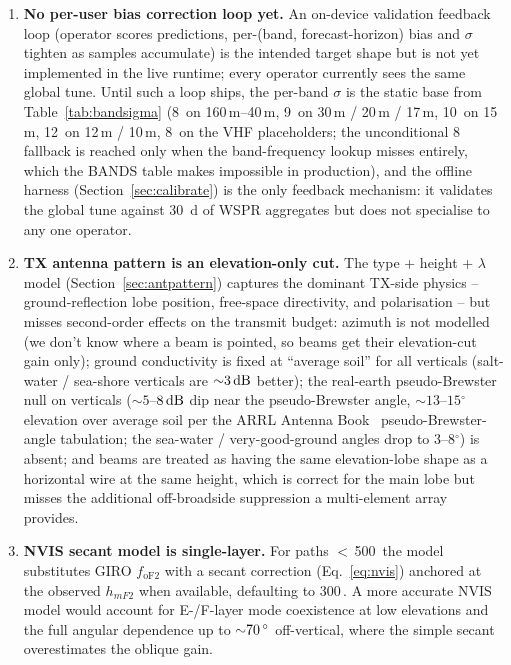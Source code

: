 \documentclass[11pt,a4paper]{article}
\newcommand{\SI}[2]{#1\,\text{#2}}
\newcommand{\dB}{\text{dB}}
\newcommand{\km}{\text{km}}
\newcommand{\degree}{\ensuremath{{}^\circ}}
\begin{document}
\begin{enumerate}[leftmargin=*]
  \item \textbf{No per-user bias correction loop yet.}  An
        on-device validation feedback loop (operator scores
        predictions, per-(band, forecast-horizon) bias and
        $\sigma$ tighten as samples accumulate) is the intended
        target shape but is not yet implemented in the live
        runtime; every operator currently sees the same global
        tune.  Until
        such a loop ships, the per-band $\sigma$ is the static
        base from Table~\ref{tab:bandsigma} (\SI{8}{\dB} on
        160\,m--40\,m, \SI{9}{\dB} on 30\,m / 20\,m / 17\,m,
        \SI{10}{\dB} on 15\,m, \SI{12}{\dB} on 12\,m / 10\,m,
        \SI{8}{\dB} on the VHF placeholders; the unconditional
        \SI{8}{\dB} fallback is reached only when the
        band-frequency lookup misses entirely, which the BANDS
        table makes impossible in production), and the offline
        harness (Section~\ref{sec:calibrate}) is the only
        feedback mechanism: it validates the global tune
        against 30~d of WSPR aggregates but does not specialise
        to any one operator.

  \item \textbf{TX antenna pattern is an elevation-only cut.}
        The type + height + $\lambda$ model (Section~\ref{sec:antpattern})
        captures the dominant TX-side physics -- ground-reflection
        lobe position, free-space directivity, and polarisation --
        but misses second-order effects on the transmit budget:
        azimuth is not modelled (we don't know where a beam is
        pointed, so beams get their elevation-cut gain only);
        ground conductivity is fixed at ``average soil'' for all
        verticals (salt-water / sea-shore verticals are
        ${\sim}\SI{3}{\dB}$ better); the real-earth pseudo-Brewster
        null on verticals (${\sim}5$--$\SI{8}{\dB}$ dip near the
        pseudo-Brewster angle, ${\sim}\!13$--$15\degree$ elevation
        over average soil per the ARRL Antenna
        Book~\cite{arrl2023antenna} pseudo-Brewster-angle
        tabulation; the sea-water / very-good-ground angles drop
        to $3$--$8\degree$) is absent;
        and beams are treated as having the same elevation-lobe
        shape as a horizontal wire at the same height, which is
        correct for the main lobe but misses the additional
        off-broadside suppression a multi-element array provides.

  \item \textbf{NVIS secant model is single-layer.}  For paths
        $<$\,\SI{500}{\km} the model substitutes GIRO $f_{\text{oF2}}$
        with a secant correction (Eq.~\ref{eq:nvis}) anchored at the
        observed $h_{m\!F2}$ when available, defaulting to
        \SI{300}{\km}.  A more accurate NVIS model would account
        for E-/F-layer mode coexistence at low elevations and the
        full angular dependence up to ${\sim}\SI{70}{\degree}$
        off-vertical, where the simple secant overestimates the
        oblique gain.


\end{enumerate}
\end{document}
